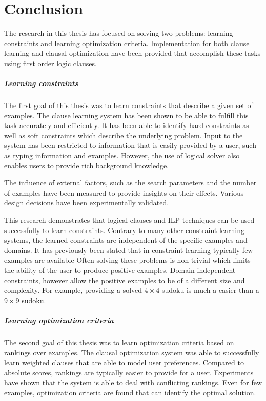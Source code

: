 \chapter{Conclusion}
\label{cha:conclusion}

The research in this thesis has focused on solving two problems: learning constraints and learning optimization criteria.
Implementation for both clause learning and clausal optimization have been provided that accomplish these tasks using first order logic clauses.

\paragraph{Learning constraints}
The first goal of this thesis was to learn constraints that describe a given set of examples.
The clause learning system has been shown to be able to fulfill this task accurately and efficiently.
It has been able to identify hard constraints as well as soft constraints which describe the underlying problem.
Input to the system has been restricted to information that is easily provided by a user, such as typing information and examples.
However, the use of logical solver also enables users to provide rich background knowledge.

The influence of external factors, such as the search parameters and the number of examples have been measured to provide insights on their effects.
Various design decisions have been experimentally validated.

This research demonstrates that logical clauses and ILP techniques can be used successfully to learn constraints.
Contrary to many other constraint learning systems, the learned constraints are independent of the specific examples and domains.
It has previously been stated that in constraint learning typically few examples are available
Often solving these problems is non trivial which limits the ability of the user to produce positive examples.
Domain independent constraints, however allow the positive examples to be of a different size and complexity.
For example, providing a solved $4 \times 4$ sudoku is much a easier than a $9 \times 9$ sudoku.

\paragraph{Learning optimization criteria}
The second goal of this thesis was to learn optimization criteria based on rankings over examples.
The clausal optimization system was able to successfully learn weighted clauses that are able to model user preferences.
Compared to absolute scores, rankings are typically easier to provide for a user.
Experiments have shown that the system is able to deal with conflicting rankings.
Even for few examples, optimization criteria are found that can identify the optimal solution.

